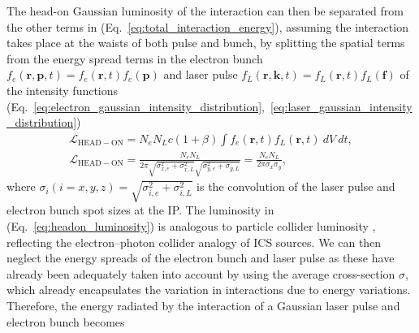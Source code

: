 \documentclass[../main.tex]{subfiles}
\begin{document}
The head-on Gaussian luminosity of the interaction can then be separated from the other terms in (Eq.~\ref{eq:total_interaction_energy}), assuming the interaction takes place at the waists of both pulse and bunch, by splitting the spatial terms from the energy spread terms in the electron bunch $f_{e}\left(\mathbf{r},\mathbf{p},t\right) = f_{e}\left(\mathbf{r},t\right)f_{e}\left(\mathbf{p}\right)$ and laser pulse $f_{L}\left(\mathbf{r},\mathbf{k},t\right) = f_{L}\left(\mathbf{r},t\right)f_{L}\left(\mathbf{f}\right)$ of the intensity functions (Eq.~\ref{eq:electron_gaussian_intensity_distribution},~\ref{eq:laser_gaussian_intensity_distribution}) 
\begin{gather}
\mathcal{L}_{\mathrm{HEAD-ON}} = N_{e}N_{L}c\left(1+\beta\right)\int f_{e}\left(\mathbf{r},t\right)f_{L}\left(\mathbf{r},t\right)~dV~dt, \\
\mathcal{L}_{\mathrm{HEAD-ON}} = \frac{N_{e}N_{L}}{2\pi\sqrt{\sigma_{x,e}^{2}+\sigma_{x,L}^{2}}\sqrt{\sigma_{y,e}^{2}+\sigma_{y,L}}} = \frac{N_{e}N_{L}}{2\pi\sigma_{x}\sigma_{y}},
\label{eq:headon_luminosity}
\end{gather}
where $\sigma_{i}(i=x,y,z) = \sqrt{\sigma_{i,e}^{2}+\sigma_{i,L}^{2}}$ is the convolution of the laser pulse and electron bunch spot sizes at the IP. The luminosity in (Eq.~\ref{eq:headon_luminosity}) is analogous to particle collider luminosity \cite{herr2006concept,miyahara2008luminosity}, reflecting the electron--photon collider analogy of ICS sources. We can then neglect the energy spreads of the electron bunch and laser pulse as these have already been adequately taken into account by using the average cross-section $\sigma$, which already encapsulates the variation in interactions due to energy variations. Therefore, the energy radiated by the interaction of a Gaussian laser pulse and electron bunch becomes  
\end{document}
